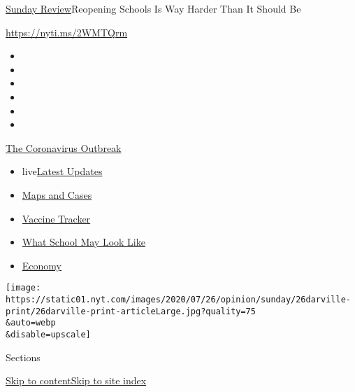 \href{/section/opinion/sunday}{Sunday Review}\textbar{}Reopening Schools
Is Way Harder Than It Should Be

\url{https://nyti.ms/2WMTQrm}

\begin{itemize}
\item
\item
\item
\item
\item
\item
\end{itemize}

\href{https://www.nytimes.com/news-event/coronavirus?action=click\&pgtype=Article\&state=default\&region=TOP_BANNER\&context=storylines_menu}{The
Coronavirus Outbreak}

\begin{itemize}
\tightlist
\item
  live\href{https://www.nytimes.com/2020/08/01/world/coronavirus-covid-19.html?action=click\&pgtype=Article\&state=default\&region=TOP_BANNER\&context=storylines_menu}{Latest
  Updates}
\item
  \href{https://www.nytimes.com/interactive/2020/us/coronavirus-us-cases.html?action=click\&pgtype=Article\&state=default\&region=TOP_BANNER\&context=storylines_menu}{Maps
  and Cases}
\item
  \href{https://www.nytimes.com/interactive/2020/science/coronavirus-vaccine-tracker.html?action=click\&pgtype=Article\&state=default\&region=TOP_BANNER\&context=storylines_menu}{Vaccine
  Tracker}
\item
  \href{https://www.nytimes.com/interactive/2020/07/29/us/schools-reopening-coronavirus.html?action=click\&pgtype=Article\&state=default\&region=TOP_BANNER\&context=storylines_menu}{What
  School May Look Like}
\item
  \href{https://www.nytimes.com/live/2020/07/31/business/stock-market-today-coronavirus?action=click\&pgtype=Article\&state=default\&region=TOP_BANNER\&context=storylines_menu}{Economy}
\end{itemize}

\texttt{[image: https://static01.nyt.com/images/2020/07/26/opinion/sunday/26darville-print/26darville-print-articleLarge.jpg?quality=75\\\&auto=webp\\\&disable=upscale]}

Sections

\protect\hyperlink{site-content}{Skip to
content}\protect\hyperlink{site-index}{Skip to site index}

